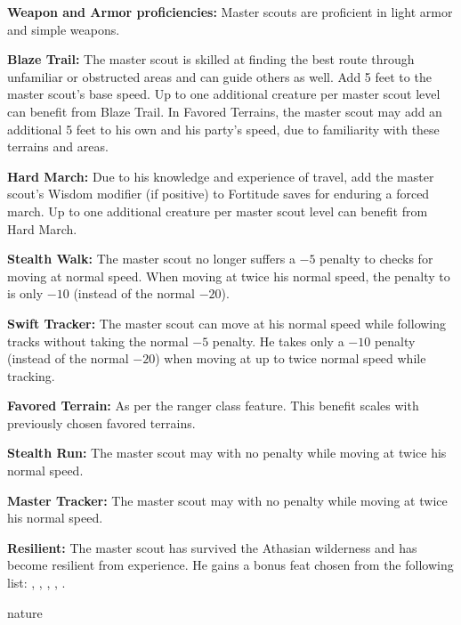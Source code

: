 {
\textbf{Weapon and Armor proficiencies:} Master scouts are proficient in light armor and simple weapons.

\textbf{Blaze Trail:} The master scout is skilled at finding the best route through unfamiliar or obstructed areas and can guide others as well. Add 5 feet to the master scout’s base speed. Up to one additional creature per master scout level can benefit from Blaze Trail. In Favored Terrains, the master scout may add an additional 5 feet to his own and his party’s speed, due to familiarity with these terrains and areas.

\textbf{Hard March:} Due to his knowledge and experience of travel, add the master scout’s Wisdom modifier (if positive) to Fortitude saves for enduring a forced march. Up to one additional creature per master scout level can benefit from Hard March.

\textbf{Stealth Walk:} The master scout no longer suffers a $-5$ penalty to  checks for moving at normal speed. When moving at twice his normal speed, the penalty to  is only $-10$ (instead of the normal $-20$).

\textbf{Swift Tracker:} The master scout can move at his normal speed while following tracks without taking the normal $-5$ penalty. He takes only a $-10$ penalty (instead of the normal $-20$) when moving at up to twice normal speed while tracking.

\textbf{Favored Terrain:} As per the ranger class feature. This benefit scales with previously chosen favored terrains.

\textbf{Stealth Run:} The master scout may  with no penalty while moving at twice his normal speed.

\textbf{Master Tracker:} The master scout may  with no penalty while moving at twice his normal speed.

\textbf{Resilient:} The master scout has survived the Athasian wilderness and has become resilient from experience. He gains a bonus feat chosen from the following list: , , , , .
}
{}
{nature}
{}
{}
{}